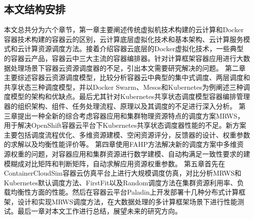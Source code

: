 \subsection{本文结构安排}
本文总共分为六个章节，第一章主要阐述传统虚拟机技术构建的云计算和Docker容器技术构建的容器云的区别，云计算底层虚拟化技术和基本架构、云计算服务模式和云计算资源调度方法。接着介绍容器云底层的Docker虚拟化技术，一些典型的容器云产品，容器云中三大主流的容器编排器。针对计算框架容器应用进行大数据处理场景下容器云资源调度器的不足，引出本文需要研究解决的问题。
第二章主要综述容器云资源调度模型，比较分析容器云中典型的集中式调度、两层调度和共享状态三种调度模型，并以Docker Swarm、Mesos和Kubernetes为例阐述三种调度模型的架构和优缺点。最后尤其针对Kubernetes共享状态调度模型容器编排管理器的组织架构、组件、任务处理流程、原理以及其调度的不足进行深入分析。
第三章提出一种全新的综合考虑容器应用和集群物理资源特点的调度方案MRWS，用于解决OpenShift容器云平台下Kubernetes共享状态调度器性能的不足。新方案主要包括调度流程优化、多维资源建模、空闲资源评分，反馈器的设计、权重参数的求解以及均衡性能评价等。
第四章使用FAHP方法解决新的调度方案中多维资源权重的问题，对容器应用和集群资源进行数学建模、自动构满足一致性要求的建模糊成对比矩阵和判断矩阵，自动求解应用资源权重参数。
第五章首先在ContainerCloudSim容器云仿真平台上进行大规模调度仿真，对比分析MRWS和Kubernetes默认调度方法、FirstFit以及Random调度方法在集群资源利用率、负载均衡性方面的性能。然后在容器云平台Paladin上开发部署十几种分布式计算框架，设计和实现MRWS调度方法，在大数据处理的多计算框架场景下进行性能测试。最后一章对本文工作进行总结，展望未来的研究方向。

